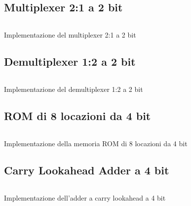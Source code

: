 \subsection*{Multiplexer 2:1 a 2 bit}
\begin{code}
    \inputminted{vhdl}{vhdl/mux_2_1_2bit.vhd}
    \caption{Implementazione del multiplexer 2:1 a 2 bit}
    \label{cod:mux_2_1_2bit}
\end{code}

\subsection*{Demultiplexer 1:2 a 2 bit}
\begin{code}
    \inputminted{vhdl}{vhdl/dmux_1_2_2bit.vhd}
    \caption{Implementazione del demultiplexer 1:2 a 2 bit}
    \label{cod:dmux_1_2_2bit}
\end{code}

\subsection{ROM di 8 locazioni da 4 bit}
\begin{code}
    \inputminted{vhdl}{vhdl/ROM_8_4.vhd}
    \caption{Implementazione della memoria ROM di 8 locazioni da 4 bit}
    \label{cod:ROM_8_4}
\end{code}

\subsection{Carry Lookahead Adder a 4 bit}
\begin{code}
    \inputminted{vhdl}{vhdl/carry_look_ahead_adder_4.vhd}
    \caption{Implementazione dell'adder a carry lookahead a 4 bit}
    \label{cod:carry_look_ahead_adder_4}
\end{code}
